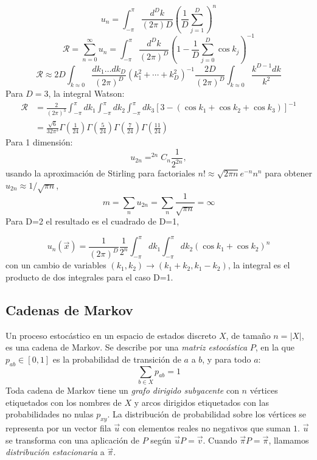 \begin{equation}
    u_n=\int_{-\pi}^\pi \frac{d^Dk}{(2\pi)D}\left(\frac{1}{D}\sum_{j=1}^D\right)^n
\end{equation}{}
\begin{equation}
    \mathcal{R}=\sum_{n=0}^\infty u_n=\int_{-\pi}^\pi\frac{d^Dk}{(2 \pi)^D}\left(1-\frac{1}{D}\sum_{j=0}^D\cos k_j\right)^{-1}
\end{equation}{}
\begin{equation}
    \mathcal{R}\approx 2D\int_{k\approx0}\frac{dk_1\dots dk_D}{(2\pi)^D}(k_1^2+\cdots+k_D^2)^{-1}\frac{2D}{(2\pi)^D}\int_{k\approx0}\frac{k^{D-1}dk}{k^2}
\end{equation}{}
Para $D=3$, la integral Watson:
\begin{align}
    \mathcal{R}&=\frac{2}{(2\pi)^3}\int_{-\pi}^\pi dk_1\int_{-\pi}^\pi dk_2\int_{-\pi}^\pi dk_3[3-(\cos k_1+\cos k_2 +\cos k_3)]^{-1}\\
    &=\frac{\sqrt{6}}{32\pi^3}\Gamma(\frac{1}{24})\Gamma(\frac{5}{24})\Gamma(\frac{7}{24})\Gamma(\frac{11}{24})
\end{align}{}
Para 1 dimensión:
\begin{equation}
    u_{2n}=^{2n}C_n\frac{1}{2^{2n}},
\end{equation}{}
usando la aproximación de Stirling para factoriales $n!\approx \sqrt{2\pi n}e^{-n}n^n$ para obtener $u_{2n}\approx 1/\sqrt{\pi n}$,
\begin{equation}
    m=\sum_nu_{2n}=\sum_n\frac{1}{\sqrt{\pi n}}=\infty
\end{equation}{}
Para D=2 el resultado es el cuadrado de D=1,

\begin{equation}
u_n(\Vec{x})=\frac{1}{(2\pi)^D}\frac{1}{2^n}\int_{-\pi}^\pi dk_1\int_{-\pi}^\pi dk_2(\cos{k_1}+\cos{k_2})^n   
\end{equation}
con un cambio de variables $(k_1,k_2)\xrightarrow{}(k_1+k_2,k_1-k_2)$, la integral es el producto de dos integrales para el caso D=1.

\subsection{Cadenas de Markov}
Un proceso estocástico en un espacio de estados discreto $X$, de tamaño $n=|X|$, es una cadena de Markov. Se describe por una \textit{matriz estocástica} $P$, en la que $p_{ab}\in [0,1]$ es la probabilidad de transición de $a$ a $b$, y para todo $a$:
\begin{equation}
    \sum_{b\in X}p_{ab}=1
\end{equation}
Toda cadena de Markov tiene un \textit{grafo dirigido subyacente} con $n$ vértices etiquetados con los nombres de $X$ y arcos dirigidos etiquetados con las probabilidades no nulas $p_{xy}$. La distribución de probabilidad sobre los vértices se representa por un vector fila $\Vec{u}$ con elementos reales no negativos que suman $1$. $\vec{u}$ se transforma con una aplicación de $P$ según $\vec{u}P=\Vec{v}$. Cuando $\vec{\pi}P=\vec{\pi}$, llamamos \textit{distribución estacionaria} a $\vec{\pi}$.\\

